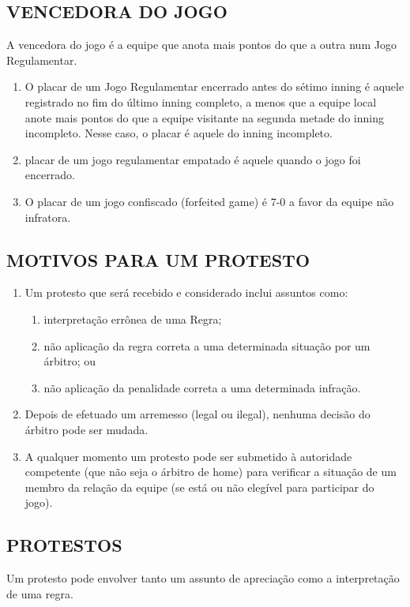 \subsection{VENCEDORA DO JOGO}

A vencedora do jogo é a equipe que anota mais pontos do que a outra num Jogo Regulamentar.

\begin{enumerate}[label=(\alph*)]
	\item  O placar de um Jogo Regulamentar encerrado antes do sétimo \gls{inning} é aquele registrado no fim do último \gls{inning} completo, a menos que a equipe local anote mais pontos do que a equipe visitante na segunda metade do \gls{inning} incompleto. Nesse caso, o placar é aquele do \gls{inning} incompleto.
	\item  placar de um jogo regulamentar empatado é aquele quando o jogo foi encerrado.
	\item  O placar de um jogo confiscado (\gls{forfeited game}) é 7-0 a favor da equipe não infratora.
\end{enumerate}

\subsection{MOTIVOS PARA UM PROTESTO}

\begin{enumerate}[label=(\alph*)]
	\item  Um protesto que será recebido e considerado inclui assuntos como:
	 \begin{enumerate}[label=\roman*.]
	 	\item  interpretação errônea de uma Regra;
		\item  não aplicação da regra correta a uma determinada situação por um árbitro; ou
		\item  não aplicação da penalidade correta a uma determinada infração.
	 \end{enumerate}
	\item  Depois de efetuado um arremesso (legal ou ilegal), nenhuma decisão do árbitro pode ser mudada.
	\item  A qualquer momento um protesto pode ser submetido à autoridade  competente (que não seja o árbitro de \gls{home}) para verificar a situação de um membro da relação da equipe (se está ou não elegível para participar do jogo).
\end{enumerate}

\subsection{PROTESTOS}
 Um protesto pode envolver tanto um assunto de apreciação como a interpretação de uma regra.


